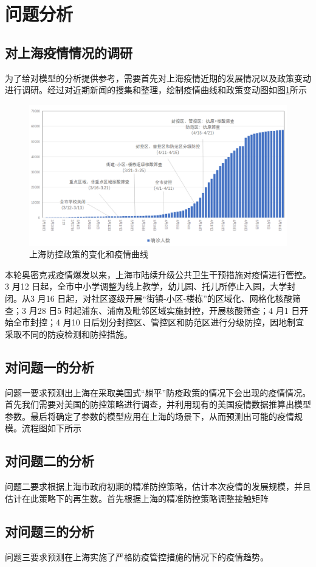 \documentclass[bwprint]{gmcmthesis}
\numberwithin{figure}{section}
\begin{document}
\section{问题分析}
\subsection{对上海疫情情况的调研}
为了给对模型的分析提供参考，需要首先对上海疫情近期的发展情况以及政策变动进行调研。经过对近期新闻的搜集和整理，绘制疫情曲线和政策变动图如图\ref{sh}所示
\begin{figure}[!h]
\centering
\includegraphics[width=.9\textwidth]{shanghai_bianhua.png}
\caption{上海防控政策的变化和疫情曲线}
\label{sh}
\end{figure}
\par 本轮奥密克戎疫情爆发以来，上海市陆续升级公共卫生干预措施对疫情进行管控。3 月12 日起，全市中小学调整为线上教学，幼儿园、托儿所停止入园，大学封闭。从3 月16 日起，对社区逐级开展“街镇-小区-楼栋”的区域化、网格化核酸筛查；3 月28 日5 时起浦东、浦南及毗邻区域实施封控，开展核酸筛查；4 月1 日开始全市封控；4 月10 日后划分封控区、管控区和防范区进行分级防控，因地制宜采取不同的防疫检测和防控措施。
\subsection{对问题一的分析}
问题一要求预测出上海在采取美国式“躺平”防疫政策的情况下会出现的疫情情况。首先我们需要对美国的防控策略进行调查，并利用现有的美国疫情数据推算出模型参数。最后将确定了参数的模型应用在上海的场景下，从而预测出可能的疫情规模。流程图如下所示
\subsection{对问题二的分析}
问题二要求根据上海市政府初期的精准防控策略，估计本次疫情的发展规模，并且估计在此策略下的再生数。首先根据上海的精准防控策略调整接触矩阵
\subsection{对问题三的分析}
问题三要求预测在上海实施了严格防疫管控措施的情况下的疫情趋势。
\end{document}
